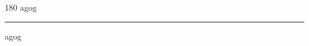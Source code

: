
\begin{frame}
\begin{center}
\begin{turn}{180}
{\fontsize{2.5cm}{1em}\selectfont agog}
\end{turn}
\vspace{1em}\par  
\hrule
\vspace{1em}\par  
{\fontsize{2.5cm}{1em}\selectfont agog}
\end{center}
\end{frame}
